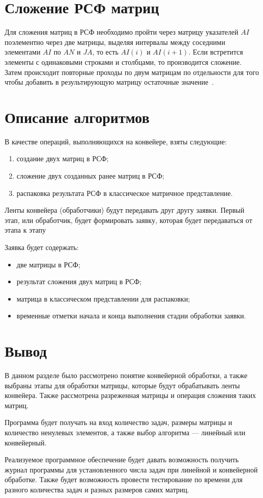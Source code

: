 \section{Сложение РСФ матриц}

Для сложения матриц в РСФ необходимо пройти через матрицу указателей $AI$ поэлементно через две матрицы, выделяя интервалы между соседними элементами $AI$ по $AN$ и $JA$, то есть $AI(i)$ и $AI(i + 1)$.
Если встретится элементы с одинаковыми строками и столбцами, то производится сложение. Затем происходит повторные проходы по двум матрицам  по отдельности для того чтобы добавить в результирующую матрицу остаточные значение~\cite{csr}.

\section{Описание алгоритмов}

В качестве операций, выполняющихся на конвейере, взяты следующие:
\begin{enumerate}
	\item создание двух матриц в РСФ;
	\item сложение двух созданных ранее матриц в РСФ;
	\item распаковка результата РСФ в классическое матричное представление.
\end{enumerate}

Ленты конвейера (обработчики) будут передавать друг другу заявки. Первый этап, или обработчик, будет формировать заявку, которая будет передаваться от этапа к этапу

Заявка будет содержать:
\begin{itemize}
	\item две матрицы в РСФ;
	\item результат сложения двух матриц в РСФ;
	\item матрица в классическом представлении для распаковки;
	\item временные отметки начала и конца выполнения стадии обработки заявки.
\end{itemize}

\section*{Вывод}
В данном разделе было рассмотрено понятие конвейерной обработки, а также выбраны этапы для обработки матрицы, которые будут обрабатывать ленты конвейера. Также рассмотрена разреженная матрицы и операция сложения таких матриц.

Программа будет получать на вход количество задач, размеры матрицы и количество ненулевых элементов, а также выбор алгоритма --- линейный или конвейерный.

Реализуемое программное обеспечение будет давать возможность получить журнал программы для установленного числа задач при линейной и конвейерной обработке. 
Также будет возможность провести тестирование по времени для разного количества задач и разных размеров самих матриц.